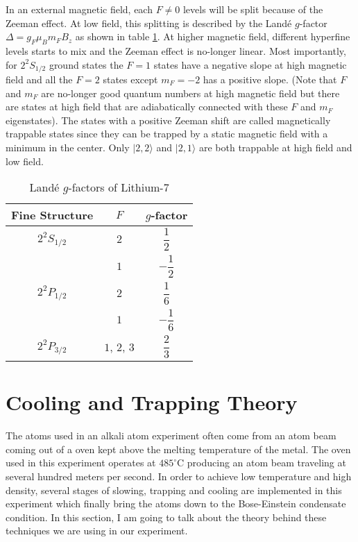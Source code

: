 In an external magnetic field, each $F\neq0$ levels will be split because of the Zeeman effect. At low field, this splitting is described by the Land\'e $g$-factor $\Delta=g_F\mu_Bm_FB_z$ as shown in table \ref{li7:g-factors}. At higher magnetic field, different hyperfine levels starts to mix and the Zeeman effect is no-longer linear. Most importantly, for $2^2S_{1/2}$ ground states the $F=1$ states have a negative slope at high magnetic field and all the $F=2$ states except $m_F=-2$ has a positive slope. (Note that $F$ and $m_F$ are no-longer good quantum numbers at high magnetic field but there are states at high field that are adiabatically connected with these $F$ and $m_F$ eigenstates). The states with a positive Zeeman shift are called magnetically trappable states since they can be trapped by a static magnetic field with a minimum in the center. Only $|2, 2\rangle$ and $|2, 1\rangle$ are both trappable at high field and low field.

\begin{table}
  \caption{Land\'e $g$-factors of Lithium-$7$}
  \label{li7:g-factors}
  \begin{center}
    \begin{tabular}{|c|c|c|}\hline
      Fine Structure & $F$ & $g$-factor \\\hline
      $2^2S_{1/2}$ & $2$ & $\dfrac 12$ \\\cline{2-3}
      & $1$ & $-\dfrac 12$ \\\hline
      $2^2P_{1/2}$ & $2$ & $\dfrac 16$ \\\cline{2-3}
      & $1$ & $-\dfrac 16$ \\\hline
      $2^2P_{3/2}$ & $1$, $2$, $3$ & $\dfrac 23$ \\\hline
    \end{tabular}
  \end{center}
\end{table}

\section{Cooling and Trapping Theory}

The atoms used in an alkali atom experiment often come from an atom beam coming out of a oven kept above the melting temperature of the metal. The oven used in this experiment operates at $485^\circ\text{C}$ producing an atom beam traveling at several hundred meters per second. In order to achieve low temperature and high density, several stages of slowing, trapping and cooling are implemented in this experiment which finally bring the atoms down to the Bose-Einstein condensate condition. In this section, I am going to talk about the theory behind these techniques we are using in our experiment.

